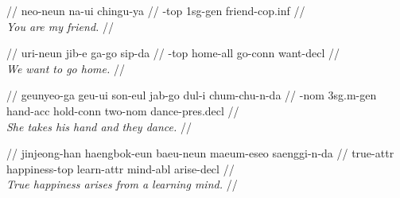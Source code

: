 \documentclass{article}
\begin{document}
\ex
\begingl
\gla {}   //
\glb neo-neun na-ui chingu-ya //
-{\sc top} {\sc 1sg}-{\sc gen} friend-{\sc cop.inf} //
\\\textit{You are my friend.} //
\endgl
\xe

\ex
\begingl
\gla {}    //
\glb uri-neun jib-e ga-go sip-da //
-{\sc top} home-{\sc all} go-{\sc conn} want-{\sc decl} //
\\\textit{We want to go home.} //
\endgl
\xe

\ex
\begingl
\gla {}      //
\glb geunyeo-ga geu-ui son-eul jab-go dul-i chum-chu-n-da //
-{\sc nom} {\sc 3sg.m}-{\sc gen} hand-{\sc acc} hold-{\sc conn} two-{\sc nom} dance-{\sc pres.decl} //
\\\textit{She takes his hand and they dance.} //
\endgl
\xe

\ex
\begingl
\gla {}     //
\glb jinjeong-han haengbok-eun baeu-neun maeum-eseo saenggi-n-da //
\glc true-{\sc attr} happiness-{\sc top} learn-{\sc attr} mind-{\sc abl} arise-{\sc decl} //
\\\textit{True happiness arises from a learning mind.} //
\endgl
\xe
\end{document}

